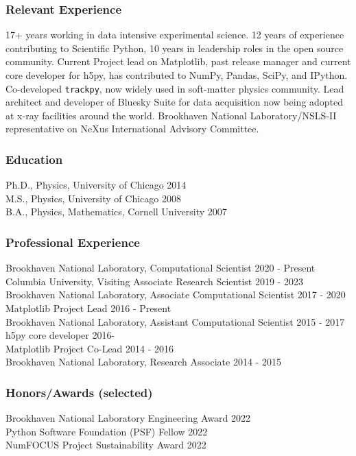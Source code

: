 \documentclass[12pt]{article}
\numberwithin{page}{section}
\begin{document}
\subsubsection*{Relevant Experience}
17+ years working in data intensive experimental science.  12 years of
experience contributing to Scientific Python, 10 years in leadership roles in
the open source community.  Current Project lead on Matplotlib, past release
manager and current core developer for h5py, has contributed to NumPy, Pandas,
SciPy, and IPython.  Co-developed \texttt{trackpy}, now widely used in
soft-matter physics community.  Lead architect and developer of Bluesky Suite
for data acquisition now being adopted at x-ray facilities around the world.
Brookhaven National Laboratory/NSLS-II representative on NeXus International
Advisory Committee.

\subsubsection*{Education}
Ph.D., Physics, University of Chicago \hfill 2014\\
M.S., Physics, University of Chicago \hfill 2008\\
B.A., Physics, Mathematics, Cornell University \hfill 2007

\subsubsection*{Professional Experience}
Brookhaven National Laboratory, Computational Scientist \hfill 2020 - Present\\
Columbia University, Visiting Associate Research Scientist \hfill 2019 - 2023 \\
Brookhaven National Laboratory, Associate Computational Scientist \hfill 2017 - 2020\\
Matplotlib Project Lead \hfill 2016 - Present\\
Brookhaven National Laboratory, Assistant Computational Scientist \hfill 2015 - 2017\\
h5py core developer \hfill 2016-\\
Matplotlib Project Co-Lead \hfill 2014 - 2016\\
Brookhaven National Laboratory, Research Associate \hfill 2014 - 2015\\

\subsubsection*{Honors/Awards (selected)}
Brookhaven National Laboratory Engineering Award \hfill 2022\\
Python Software Foundation (PSF) Fellow \hfill 2022\\
NumFOCUS Project Sustainability Award \hfill 2022
\end{document}
